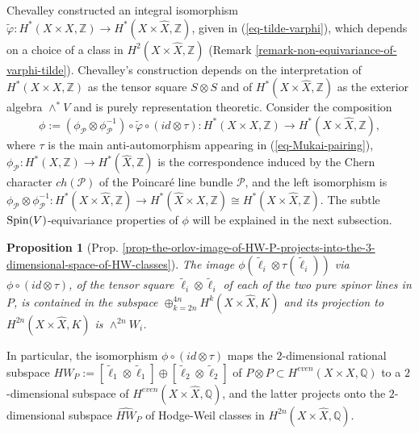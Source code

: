 \documentclass[12pt]{amsart}
\numberwithin{equation}{subsection}
\theoremstyle{plain}
\newtheorem{prop}[thm]{Proposition}
\theoremstyle{definition}
\newcommand{\QQ}{{\mathbb Q}}
\newcommand{\ZZ}{{\mathbb Z}}
\renewcommand{\P}{{\mathcal P}}
\newcommand{\Spin}{{\rm Spin}}
\begin{document}
Chevalley constructed an integral isomorphism 
$\tilde{\varphi}:H^*(X\times X,\ZZ)\rightarrow H^*(X\times\hat{X},\ZZ)$, given in (\ref{eq-tilde-varphi}), 
which depends on a choice of a class in $H^2(X\times\hat{X},\ZZ)$ (Remark \ref{remark-non-equivariance-of-varphi-tilde}). 
Chevalley's construction depends on the interpretation of $H^*(X\times X,\ZZ)$ as the tensor square $S\otimes S$ and of $H^*(X\times\hat{X},\ZZ)$ as the exterior algebra $\wedge^*V$ 
and is purely representation theoretic.
Consider the composition
\begin{equation}
\label{eq-phi-introduction}
\phi:=(\phi_\P\otimes\phi_\P^{-1})\circ\tilde{\varphi}\circ (id\otimes\tau):H^*(X\times X,\ZZ)\rightarrow H^*(X\times\hat{X},\ZZ),
\end{equation}
where $\tau$ is the main anti-automorphism appearing in (\ref{eq-Mukai-pairing}), $\phi_\P:H^*(X,\ZZ)\rightarrow H^*(\hat{X},\ZZ)$ is the correspondence induced by the Chern character $ch(\P)$ of the Poincar\'{e} line bundle $\P$, and the left isomorphism is
$\phi_\P\otimes\phi_\P^{-1}:H^*(X\!\times\!\hat{X},\ZZ)\rightarrow H^*(\hat{X}\!\times\! X,\ZZ)\cong H^*(X\!\times\!\hat{X},\ZZ)$. The subtle $\Spin(V)$-equivariance properties of $\phi$ will be explained in the next subsection. 

\begin{prop}[Prop. \ref{prop-the-orlov-image-of-HW-P-projects-into-the-3-dimensional-space-of-HW-classes}]
The image $\phi(\tilde{\ell}_i\otimes\tau(\tilde{\ell}_i))$ via $\phi\circ(id\otimes\tau)$, of the tensor square $\tilde{\ell}_i\otimes \tilde{\ell}_i$
of each of the two pure spinor lines in $P$, is contained in the subspace $\oplus_{k=2n}^{4n}H^k(X\times\hat{X},K)$ and its projection to $H^{2n}(X\times\hat{X},K)$ is $\wedge^{2n}W_i$. 
\end{prop}

In particular, the isomorphism $\phi\circ(id\otimes\tau)$ maps the $2$-dimensional rational subspace $HW_P:=[\tilde{\ell}_1\otimes \tilde{\ell}_1] \oplus [\tilde{\ell}_2\otimes \tilde{\ell}_2]$ of $P\otimes P\subset H^{even}(X\times X,\QQ)$ to a $2$-dimensional subspace of $H^{even}(X\times\hat{X},\QQ)$, and the latter projects onto the $2$-dimensional subspace $\hat{HW}_P$ of Hodge-Weil classes in $H^{2n}(X\times\hat{X},\QQ)$.
% 
\end{document}
